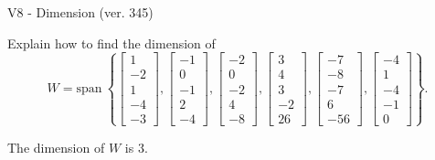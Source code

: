 \begin{exercise}
  \begin{exerciseTitle}V8 - Dimension (ver. 345)\end{exerciseTitle}
  \begin{exerciseStatement}
    Explain how to find the dimension of 
\[W=\mathrm{span}\ \left\{\left[\begin{array}{r}
1 \\
-2 \\
1 \\
-4 \\
-3
\end{array}\right] , \left[\begin{array}{r}
-1 \\
0 \\
-1 \\
2 \\
-4
\end{array}\right] , \left[\begin{array}{r}
-2 \\
0 \\
-2 \\
4 \\
-8
\end{array}\right] , \left[\begin{array}{r}
3 \\
4 \\
3 \\
-2 \\
26
\end{array}\right] , \left[\begin{array}{r}
-7 \\
-8 \\
-7 \\
6 \\
-56
\end{array}\right] , \left[\begin{array}{r}
-4 \\
1 \\
-4 \\
-1 \\
0
\end{array}\right]\right\}.\]



  \end{exerciseStatement}
  \begin{exerciseAnswer}
   The dimension of \(W\) is  \(3\).
  


  \end{exerciseAnswer}
\end{exercise}